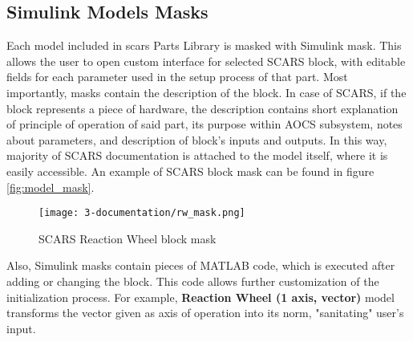 


    \subsection{Simulink Models Masks}
        Each model included in \ac{scars} Parts Library is masked with Simulink mask\cite{masks}. This allows the user to open custom interface for selected SCARS block, with editable fields for each parameter used in the setup process of that part. Most importantly, masks contain the description of the block. In case of SCARS, if the block represents a piece of hardware, the description contains short explanation of principle of operation of said part, its purpose within AOCS subsystem, notes about parameters, and description of block's inputs and outputs. In this way, majority of SCARS documentation is attached to the model itself, where it is easily accessible. An example of SCARS block mask can be found in figure \autoref{fig:model_mask}.
        
        \begin{figure}[H]
            \centering
            \texttt{[image: 3-documentation/rw\_mask.png]}
            \caption{SCARS Reaction Wheel block mask}
            \label{fig:model_mask}
        \end{figure}
        
        Also, Simulink masks contain pieces of MATLAB code, which is executed after adding or changing the block. This code allows further customization of the initialization process. For example, \textbf{Reaction Wheel (1 axis, vector)} model transforms the vector given as axis of operation into its norm, "sanitating" user's input\cite{input_sanitization}. 
